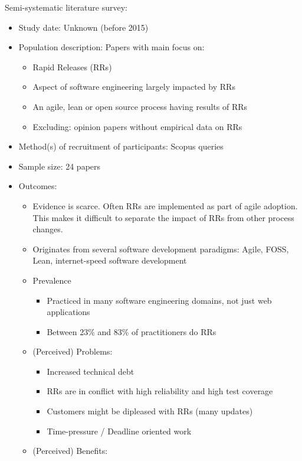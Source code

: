 \documentclass[]{book}
\providecommand{\tightlist}{%
  \setlength{\itemsep}{0pt}\setlength{\parskip}{0pt}}
\begin{document}
Semi-systematic literature survey:

\begin{itemize}
\tightlist
\item
  Study date: Unknown (before 2015)
\item
  Population description: Papers with main focus on:

  \begin{itemize}
  \tightlist
  \item
    Rapid Releases (RRs)
  \item
    Aspect of software engineering largely impacted by RRs
  \item
    An agile, lean or open source process having results of RRs
  \item
    Excluding: opinion papers without empirical data on RRs
  \end{itemize}
\item
  Method(s) of recruitment of participants: Scopus queries
\item
  Sample size: 24 papers
\item
  Outcomes:

  \begin{itemize}
  \tightlist
  \item
    Evidence is scarce. Often RRs are implemented as part of agile
    adoption. This makes it difficult to separate the impact of RRs from
    other process changes.
  \item
    Originates from several software development paradigms: Agile, FOSS,
    Lean, internet-speed software development
  \item
    Prevalence

    \begin{itemize}
    \tightlist
    \item
      Practiced in many software engineering domains, not just web
      applications
    \item
      Between 23\% and 83\% of practitioners do RRs
    \end{itemize}
  \item
    (Perceived) Problems:

    \begin{itemize}
    \tightlist
    \item
      Increased technical debt
    \item
      RRs are in conflict with high reliability and high test coverage
    \item
      Customers might be dipleased with RRs (many updates)
    \item
      Time-pressure / Deadline oriented work
    \end{itemize}
  \item
    (Perceived) Benefits:


\end{itemize}
\end{itemize}
\end{document}
